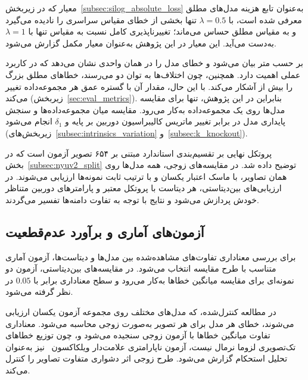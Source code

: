  معیار  که در زیربخش~\ref{subsec:silog_absolute_loss} به‌عنوان تابع هزینه مدل‌های مطلق معرفی شده است، با $\lambda=0.5$ تنها بخشی از خطای مقیاس سراسری را نادیده می‌گیرد و به مقیاس مطلق حساس می‌ماند؛ تغییرناپذیری کامل نسبت به مقیاس تنها با $\lambda=1$ به‌دست می‌آید. این معیار در این پژوهش به‌عنوان معیار مکمل گزارش می‌شود.

\label{subsec:rmse_sensitivity}%

 بر حسب متر بیان می‌شود و خطای مدل را در همان واحدی نشان می‌دهد که در کاربرد عملی اهمیت دارد. همچنین، چون اختلاف‌ها به توان دو می‌رسند، خطاهای مطلق بزرگ را بیش از  آشکار می‌کند. با این حال، مقدار آن با گستره عمق هر مجموعه‌داده تغییر می‌کند (زیربخش~\ref{sec:eval_metrics}). بنابراین در این پژوهش،  تنها برای مقایسه مدل‌ها روی یک مجموعه‌داده به‌کار می‌رود. مقایسه میان مجموعه‌داده‌ها و سنجش پایداری مدل در برابر تغییر ماتریس کالیبراسیون دوربین بر پایه  و $\delta_1$ انجام می‌شود (زیربخش‌های~\ref{subsec:intrinsics_variation} و~\ref{subsec:k_knockout}).

پروتکل نهایی بر تقسیم‌بندی استاندارد  مبتنی بر ۶۵۴ تصویر آزمون است که در بخش~\ref{subsec:nyuv2_split} توضیح داده شد. در مقایسه‌های زوجی، همه مدل‌ها روی همان تصاویر، با ماسک اعتبار یکسان و با ترتیب ثابت نمونه‌ها ارزیابی می‌شوند. در ارزیابی‌های بین‌دیتاستی، هر دیتاست با پروتکل معتبر و پارامترهای دوربین متناظر خودش پردازش می‌شود و نتایج با توجه به تفاوت دامنه‌ها تفسیر می‌گردند.

\subsection{آزمون‌های آماری و برآورد عدم‌قطعیت}
\label{subsec:statistical_tests}

برای بررسی معناداری تفاوت‌های مشاهده‌شده بین مدل‌ها و دیتاست‌ها، آزمون آماری متناسب با طرح مقایسه انتخاب می‌شود. در مقایسه‌های بین‌دیتاستی، آزمون  دو نمونه‌ای برای مقایسه میانگین خطاها به‌کار می‌رود و سطح معناداری برابر با $0.05$ در نظر گرفته می‌شود.

در مطالعه کنترل‌شده، که مدل‌های مختلف روی مجموعه آزمون یکسان ارزیابی می‌شوند، خطای هر مدل برای هر تصویر به‌صورت زوجی محاسبه می‌شود. معناداری تفاوت میانگین خطاها با آزمون  زوجی سنجیده می‌شود و، چون توزیع خطاهای تک‌تصویری لزوما نرمال نیست، آزمون ناپارامتری علامت‌دار ویلکاکسون~\cite{Wilcoxon1945} نیز به‌عنوان تحلیل استحکام گزارش می‌شود. طرح زوجی اثر دشواری متفاوت تصاویر را کنترل می‌کند.

